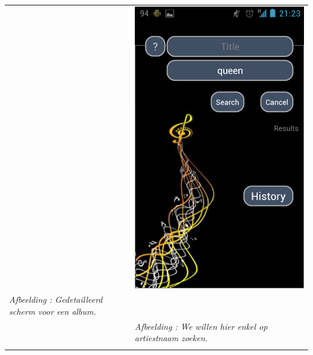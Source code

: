 \documentclass[11pt,a4paper]{article}
\newcounter{figc}
\newcommand{\increaseFigID} {%
   \stepcounter{figc}%
   \thefigc}
\newcommand{\figID}[1]{\small \textit{Afbeelding \increaseFigID : #1} \\ \normalsize}
\begin{document}
{\begin{tabular} {p{7cm} >{\centering\arraybackslash}p{7cm}@{\hskip 0.5in}}
		& \includegraphics[scale=0.28]{Pictures/Screenshot_2013-05-24-21-23-29.png} \\
		
		\centering \figID{Gedetailleerd scherm voor een album.} 
		&  \figID{We willen hier enkel op artiestnaam zoeken.} 
		
		\vspace{1pt} & \vspace{1pt} \\
		

\end{tabular}}
\end{document}

